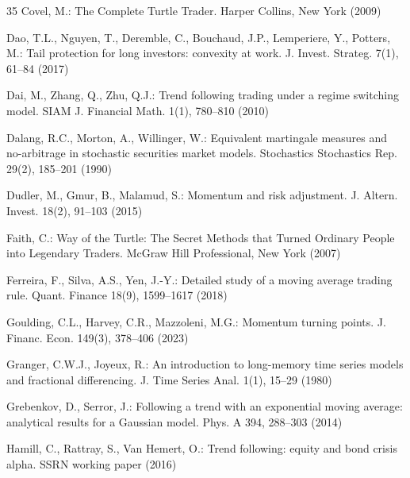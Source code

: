 \documentclass[hidelinks]{siamonline250211}
\begin{document}
\begin{thebibliography}{35}
	 Covel, M.: The Complete Turtle Trader. Harper Collins, New York (2009)
	
	 Dao, T.L., Nguyen, T., Deremble, C., Bouchaud, J.P., Lemperiere, Y., Potters, M.: Tail protection for long investors: convexity at work. J. Invest. Strateg. 7(1), 61--84 (2017)
	
	 Dai, M., Zhang, Q., Zhu, Q.J.: Trend following trading under a regime switching model. SIAM J. Financial Math. 1(1), 780--810 (2010)
	
	 Dalang, R.C., Morton, A., Willinger, W.: Equivalent martingale measures and no-arbitrage in stochastic securities market models. Stochastics Stochastics Rep. 29(2), 185--201 (1990)
	
	 Dudler, M., Gmur, B., Malamud, S.: Momentum and risk adjustment. J. Altern. Invest. 18(2), 91--103 (2015)
	
	 Faith, C.: Way of the Turtle: The Secret Methods that Turned Ordinary People into Legendary Traders. McGraw Hill Professional, New York (2007)
	
	 Ferreira, F., Silva, A.S., Yen, J.-Y.: Detailed study of a moving average trading rule. Quant. Finance 18(9), 1599--1617 (2018)
	
	 Goulding, C.L., Harvey, C.R., Mazzoleni, M.G.: Momentum turning points. J. Financ. Econ. 149(3), 378--406 (2023)
	
	 Granger, C.W.J., Joyeux, R.: An introduction to long-memory time series models and fractional differencing. J. Time Series Anal. 1(1), 15--29 (1980)
	
	 Grebenkov, D., Serror, J.: Following a trend with an exponential moving average: analytical results for a Gaussian model. Phys. A 394, 288--303 (2014)
	
	
	 Hamill, C., Rattray, S., Van Hemert, O.: Trend following: equity and bond crisis alpha. SSRN working paper (2016)
	

\end{thebibliography}
\end{document}
